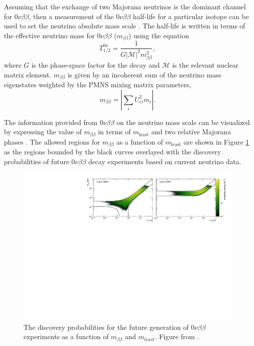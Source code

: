 Assuming that the exchange of two Majorana neutrinos is the dominant channel for $0\nu\beta\beta$, then a measurement of the $0\nu\beta\beta$ half-life for a particular isotope can be used to set the neutrino absolute mass scale \cite{double_beta2}. The half-life is written in terms of the effective neutrino mass for $0\nu\beta\beta$ ($m_{\beta\beta}$) using the equation 
\begin{equation}
    T^{0\nu}_{1/2}=\frac{1}{G|\mathcal{M}|^2m_{\beta\beta}^2},
\end{equation}
where $G$ is the phase-space factor for the decay and $\mathcal{M}$ is the relevant nuclear matrix element. $m_{\beta\beta}$ is given by an incoherent sum of the neutrino mass eigenstates weighted by the PMNS mixing matrix parameters,
\begin{equation}
    m_{\beta\beta}=\left|\sum_{i}U_{ei}^2m_i\right|.
    \label{eq:chap2-mbetabeta}
\end{equation}

The information provided from $0\nu\beta\beta$ on the neutrino mass scale can be visualized by expressing the value of $m_{\beta\beta}$ in terms of $m_\textrm{least}$ and two relative Majorana phases \cite{double_beta_plot}. The allowed regions for $m_{\beta\beta}$ as a function of $m_\textrm{least}$ are shown in Figure \ref{fig:chap2-nu-mass-0nbb-posterior} as the regions bounded by the black curves overlayed with the discovery probabilities of future $0\nu\beta\beta$ decay experiments based on current neutrino data.
\begin{figure}[htbp]
    \centering
    \includegraphics[width=1.0\textwidth]{figs/Chapter-2/230228_nu_mass_0nbb.pdf}
    \caption{The discovery probabilities for the future generation of $0\nu\beta\beta$ experiments as a function of $m_{\beta\beta}$ and $m_{least}$. Figure from \cite{double_beta_plot}.}
    \label{fig:chap2-nu-mass-0nbb-posterior}
\end{figure}

